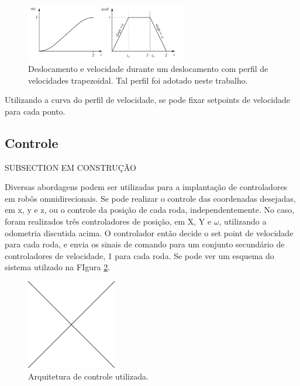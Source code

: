 \begin{figure}[h]
  \centering
  \includegraphics[width = 0.63\textwidth]{imagens/trapezoidal}
  \caption{Deslocamento e velocidade durante um deslocamento com perfil de velocidades trapezoidal. Tal perfil foi adotado neste trabalho.}
  \label{fig:trap}
\end{figure}

Utilizando a curva do perfil de velocidade, se pode fixar setpoints de velocidade para cada ponto.

\subsection{Controle}

SUBSECTION EM CONSTRUÇÃO

Diversas abordagens podem ser utilizadas para a implantação de controladores em robôs omnidirecionais. Se pode realizar o controle das coordenadas desejadas, em x, y e z, ou o controle da posição de cada roda, independentemente. No caso, foram realizados três controladores de posição, em X, Y e $\omega$, utilizando a odometria discutida acima. O controlador então decide o set point de velocidade para cada roda, e envia os sinais de comando para um conjunto secundário de controladores de velocidade, 1 para cada roda. Se pode ver um esquema do sistema utilzado na FIgura \ref{fig:controle}.

\begin{figure}[h]
  \centering
  \includegraphics[width = 0.35\textwidth]{imagens/edc}
  \caption{Arquitetura de controle utilizada.}
  \label{fig:controle}
\end{figure}


